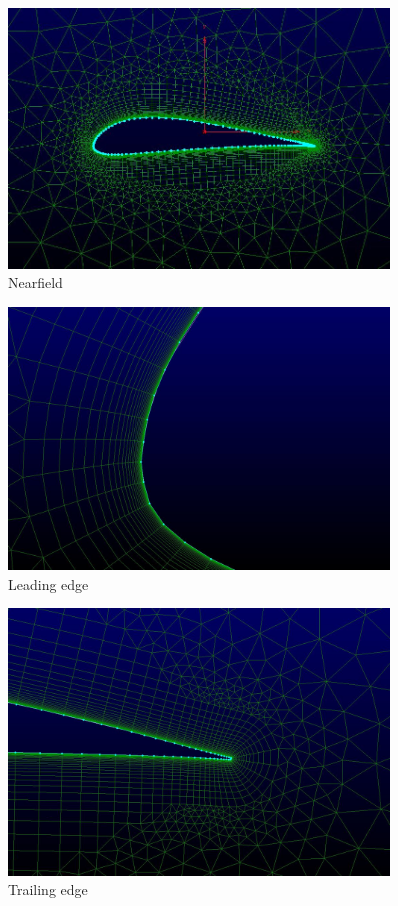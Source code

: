 \begin{enumerate}
\begin{figure}[H]
	\centering
	\includegraphics[width=0.9\textwidth]{general_images/nearfield}
	\caption{Nearfield}
\label{fig:nearfield}
\end{figure}	

\begin{figure}[H]
	\centering
	\includegraphics[width=0.9\textwidth]{general_images/LE1}
	\caption{Leading edge}
\label{fig:LE}
\end{figure}

\begin{figure}[H]
	\centering
	\includegraphics[width=0.9\textwidth]{general_images/TE1}
	\caption{Trailing edge}
\label{fig:TE}
\end{figure}


\end{enumerate}
